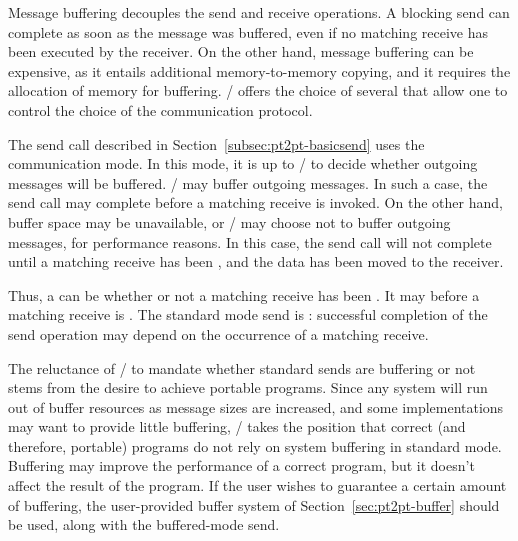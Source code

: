 Message buffering
decouples the send and receive operations.  A blocking send can
complete as soon
as the message was buffered, even if no matching receive has been executed
by the receiver.  On the other hand, message buffering can be expensive,
as it entails additional memory-to-memory copying, and it requires the
allocation of memory for buffering.  \MPI/ offers the choice of
several  that allow one to control the choice of the
communication protocol.

The send call described in Section~\ref{subsec:pt2pt-basicsend}
uses
the  communication mode.  In this mode,
it is up to \MPI/ to decide whether outgoing
messages will be buffered.  \MPI/ may
buffer outgoing messages.  In such a case, the send call may complete
before a matching receive is invoked.  On the other hand, buffer space may be
unavailable, or \MPI/ may choose not to buffer
outgoing messages, for performance reasons. In this case,
the send call will not complete until a matching receive has been , and
the data has been moved to the receiver.

Thus, a  can be  whether or not a
matching receive has been .  It may  before a matching receive
is .  The
standard mode send is : successful completion of the send
operation may depend on the occurrence of a matching receive.

\begin{rationale}
The reluctance of \MPI/ to mandate whether standard sends are buffering
or not stems from the desire to achieve portable programs.  Since any
system will run out of buffer resources as message sizes are increased,
and some implementations may want to provide little buffering, \MPI/
takes the position that correct (and therefore, portable) programs
do not rely on system buffering in standard mode.  Buffering
may improve the performance
of a correct program, but it doesn't affect the result of the program.
If the user wishes to guarantee a certain amount of buffering, the
user-provided buffer system of Section~\ref{sec:pt2pt-buffer} should be used,
along with the buffered-mode send.
\end{rationale}

